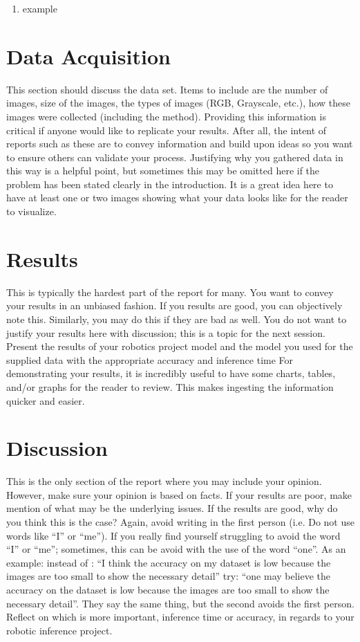 \documentclass[10pt,journal,compsoc]{IEEEtran}
\begin{document}
		
		
		\begin{enumerate}
			\item example
			
		\end{enumerate}
		
		\section{Data Acquisition}
		This section should discuss the data set. Items to include are the number of images, size of the images, the types of images (RGB, Grayscale, etc.), how these images were collected (including the method). Providing this information is critical if anyone would like to replicate your results. After all, the intent of reports such as these are to convey information and build upon ideas so you want to ensure others can validate your process.
		Justifying why you gathered data in this way is a helpful point, but sometimes this may be omitted here if the problem has been stated clearly in the introduction.
		It is a great idea here to have at least one or two images showing what your data looks like for the reader to visualize.
		
		\section{Results}
		This is typically the hardest part of the report for many. You want to convey your results in an unbiased fashion. If you results are good, you can objectively note this. Similarly, you may do this if they are bad as well. You do not want to justify your results here with discussion; this is a topic for the next session. 
		Present the results of your robotics project model and the model you used for the supplied data with the appropriate accuracy and inference time
		For demonstrating your results, it is incredibly useful to have some charts, tables, and/or graphs for the reader to review. This makes ingesting the information quicker and easier.
		
		\section{Discussion}
		This is the only section of the report where you may include your opinion. However, make sure your opinion is based on facts. If your results are poor, make mention of what may be the underlying issues. If the results are good, why do you think this is the case? Again, avoid writing in the first person (i.e. Do not use words like “I” or “me”). If you really find yourself struggling to avoid the word “I” or “me”; sometimes, this can be avoid with the use of the word “one”. As an example: instead of : “I think the accuracy on my dataset is low because the images are too small to show the necessary detail” try: “one may believe the accuracy on the dataset is low because the images are too small to show the necessary detail”. They say the same thing, but the second avoids the first person. 
		Reflect on which is more important, inference time or accuracy, in regards to your robotic inference project.
		
\end{document}
